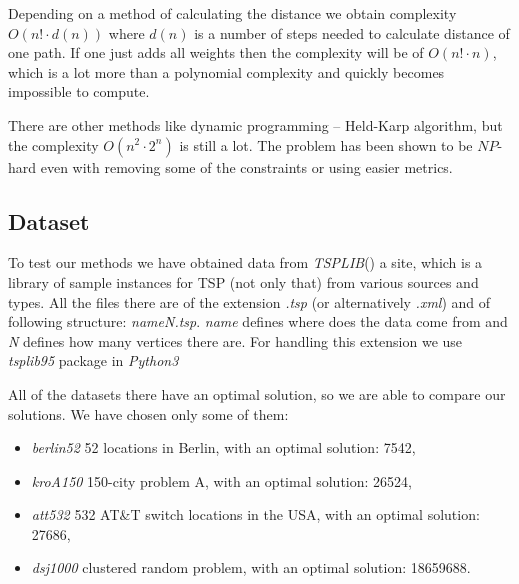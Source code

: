 	Depending on a method of calculating the distance we obtain complexity $O(n! \cdot d(n))$ where $d(n)$ is a number of steps needed to calculate distance of one path. If one just adds all weights then the complexity will be of $O(n! \cdot n)$, which is a lot more than a polynomial complexity and quickly becomes impossible to compute.
	
	There are other methods like dynamic programming -- Held-Karp algorithm, but the complexity $O(n^2 \cdot 2^n)$ is still a lot. The problem has been shown to be $NP$-hard even with removing some of the constraints or using easier metrics.

\subsection{Dataset}
	To test our methods we have obtained data from \textit{TSPLIB}(\cite{TSPLIB8:online}) a site, which is a library of sample instances for TSP (not only that) from various sources and types. All the files there are of the extension \textit{.tsp} (or alternatively \textit{.xml}) and of following structure: \textit{nameN.tsp}. \textit{name} defines where does the data come from and \textit{N} defines how many vertices there are. For handling this extension we use \textit{tsplib95} package in \textit{Python3}
	
	All of the datasets there have an optimal solution, so we are able to compare our solutions. We have chosen only some of them:
	\begin{itemize}
		\item \textit{berlin52} 52 locations in Berlin, with an optimal solution: 7542,
		\item \textit{kroA150} 150-city problem A, with an optimal solution: 26524,
		\item \textit{att532} 532 AT\&T switch locations in the USA, with an optimal solution: 27686,
		\item \textit{dsj1000} clustered random problem, with an optimal solution: 18659688.
	\end{itemize}